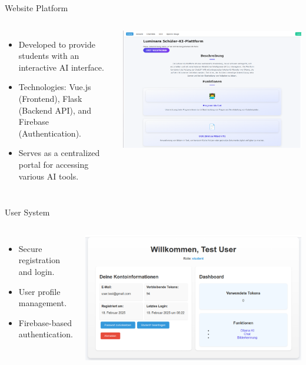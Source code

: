 \documentclass{beamer}
\begin{document}
\begin{frame}{Website Platform}
  \begin{columns}
      \begin{itemize}
        \item Developed to provide students with an interactive AI interface.
        \item Technologies: Vue.js (Frontend), Flask (Backend API), and Firebase (Authentication).
        \item Serves as a centralized portal for accessing various AI tools.
      \end{itemize}
      \centering
      \includegraphics[width=\textwidth]{homepage-screenshot.png}
  \end{columns}
\end{frame}

\begin{frame}{User System}
  \begin{columns}
      \begin{itemize}
        \item Secure registration and login.
        \item User profile management.
        \item Firebase-based authentication.
      \end{itemize}
      \centering
      \includegraphics[width=\textwidth]{Account-Managment.png}
  \end{columns}
\end{frame}
\end{document}
